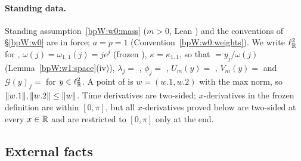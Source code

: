 \paragraph{Standing data.} Standing assumption~\ref{bpW:w0:mass} ($m>0$, Lean ) and the conventions
of \S\ref{bpW:w0} are in force; $a=p=1$ (Convention~\ref{bpW:w0:weights}). We write $\ell^2_{\mathbb{R}}$ for
, $\omega(j)=\omega_{1,1}(j)=je^j$ (frozen ),
$\kappa=\kappa_{1,1}$, so that  $=y_j/\omega(j)$ (Lemma~\ref{bpW:w1:space}(iv)),
$\lambda_j=$ , $\phi_j=$ , $U_m(y)=$ ,
$V_m(y)=$  and $\mathcal G(y)_j=$  for $y\in\ell^2_{\mathbb{R}}$. A point of
 is $w=(w.1,w.2)$ with the max norm, so $\lVert w.1\rVert,\lVert w.2\rVert\le\lVert w\rVert$. Time derivatives are
two-sided; $x$-derivatives in the frozen definition are within $[0,\pi]$, but all $x$-derivatives proved below are
two-sided at every $x\in\mathbb{R}$ and are restricted to $[0,\pi]$ only at the end.

\subsection{External facts}\label{bpW:w2:ext}

